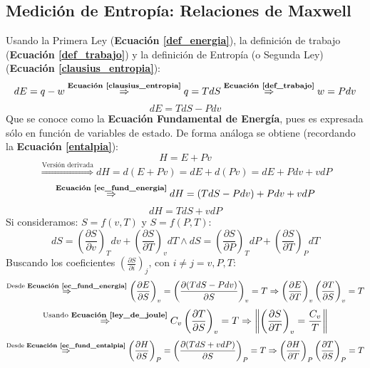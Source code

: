     \subsection{Medición de Entropía: Relaciones de Maxwell}
    
    Usando la Primera Ley (\textbf{Ecuación \ref{def_energia}}), la definición de trabajo (\textbf{Ecuación \ref{def_trabajo}}) y la definición de Entropía (o Segunda Ley) (\textbf{Ecuación \ref{clausius_entropia}}):
    \[dE=q-w \overset{\text{\textbf{Ecuación \ref{clausius_entropia}}}}{\Rightarrow}q=TdS \overset{\text{\textbf{Ecuación \ref{def_trabajo}}}}{\Rightarrow} w=Pdv\]
    \begin{equation}
    \label{ec_fund_energia}
        dE = TdS - Pdv
    \end{equation}
    Que se conoce como la \textbf{Ecuación Fundamental de Energía}, pues es expresada sólo en función de variables de estado. De forma análoga se obtiene (recordando la \textbf{Ecuación \ref{entalpia}}):
    \[H = E + Pv\]
    \[\overset{\text{Versión derivada}}{\Rightarrow} dH = d(E+ Pv)=dE + d(Pv)=dE + Pdv + vdP\]
    \[\overset{\text{\textbf{Ecuación \ref{ec_fund_energia}}}}{\Rightarrow} dH=(TdS-Pdv)+Pdv + vdP\]
    \begin{equation}
    \label{ec_fund_entalpia}
        dH=TdS+vdP
    \end{equation}
    Si consideramos: \(S=f(v,T)\) y \(S=f(P,T)\):
    \[dS=\left ( \frac{\partial S}{\partial v} \right )_{T}dv+\left ( \frac{\partial S}{\partial T} \right )_{v}dT \wedge dS=\left ( \frac{\partial S}{\partial P} \right )_{T}dP+\left ( \frac{\partial S}{\partial T} \right )_{P}dT\]
    Buscando los coeficientes \(\left ( \frac{\partial S}{\partial i} \right )_{j}\text{, con }i \neq j=v,P,T\):
    \[\overset{\text{Desde \textbf{Ecuación \ref{ec_fund_energia}}}}{\Rightarrow}\left ( \frac{\partial E}{\partial S} \right )_{v}=\left ( \frac{\partial (TdS-Pdv)}{\partial S} \right )_{v}=T\Rightarrow \left ( \frac{\partial E}{\partial T} \right )_{v}\left ( \frac{\partial T}{\partial S} \right )_{v}=T\]
    \[\overset{\text{Usando \textbf{Ecuación \ref{ley_de_joule}}}}{\Rightarrow}C_{v}\left ( \frac{\partial T}{\partial S} \right )_{v}=T\Rightarrow \left \| \left ( \frac{\partial S}{\partial T} \right )_{v}=\frac{C_{v}}{T} \right \|\]
    \[\overset{\text{Desde \textbf{Ecuación \ref{ec_fund_entalpia}}}}{\Rightarrow}\left ( \frac{\partial H}{\partial S} \right )_{P}=\left ( \frac{\partial (TdS+vdP)}{\partial S} \right )_{P}=T\Rightarrow \left ( \frac{\partial H}{\partial T} \right )_{P}\left ( \frac{\partial T}{\partial S} \right )_{P}=T\]

